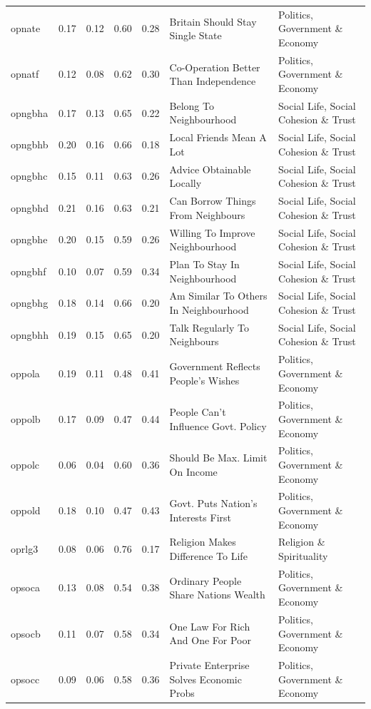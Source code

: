 \documentclass[
  12pt,
]{article}
\begin{document}
\begin{landscape}
\begin{scriptsize}
\begin{longtable}{|p{1.75in}|p{0.3in}|p{0.3in}|p{0.3in}|p{0.3in}|p{2.5in}|p{2.5in}}
opnate & 0.17 & 0.12 & 0.60 & 0.28 & Britain Should Stay Single State & Politics, Government \& Economy \\ 
opnatf & 0.12 & 0.08 & 0.62 & 0.30 & Co-Operation Better Than Independence & Politics, Government \& Economy \\ 
opngbha & 0.17 & 0.13 & 0.65 & 0.22 & Belong To Neighbourhood & Social Life, Social Cohesion \& Trust \\ 
opngbhb & 0.20 & 0.16 & 0.66 & 0.18 & Local Friends Mean A Lot & Social Life, Social Cohesion \& Trust \\ 
opngbhc & 0.15 & 0.11 & 0.63 & 0.26 & Advice Obtainable Locally & Social Life, Social Cohesion \& Trust \\ 
opngbhd & 0.21 & 0.16 & 0.63 & 0.21 & Can Borrow Things From Neighbours & Social Life, Social Cohesion \& Trust \\ 
opngbhe & 0.20 & 0.15 & 0.59 & 0.26 & Willing To Improve Neighbourhood & Social Life, Social Cohesion \& Trust \\ 
opngbhf & 0.10 & 0.07 & 0.59 & 0.34 & Plan To Stay In Neighbourhood & Social Life, Social Cohesion \& Trust \\ 
opngbhg & 0.18 & 0.14 & 0.66 & 0.20 & Am Similar To Others In Neighbourhood & Social Life, Social Cohesion \& Trust \\ 
opngbhh & 0.19 & 0.15 & 0.65 & 0.20 & Talk Regularly To Neighbours & Social Life, Social Cohesion \& Trust \\ 
oppola & 0.19 & 0.11 & 0.48 & 0.41 & Government Reflects People's Wishes & Politics, Government \& Economy \\ 
oppolb & 0.17 & 0.09 & 0.47 & 0.44 & People Can't Influence Govt. Policy & Politics, Government \& Economy \\ 
oppolc & 0.06 & 0.04 & 0.60 & 0.36 & Should Be Max. Limit On Income & Politics, Government \& Economy \\ 
oppold & 0.18 & 0.10 & 0.47 & 0.43 & Govt. Puts Nation's Interests First & Politics, Government \& Economy \\ 
oprlg3 & 0.08 & 0.06 & 0.76 & 0.17 & Religion Makes Difference To Life & Religion \& Spirituality \\ 
opsoca & 0.13 & 0.08 & 0.54 & 0.38 & Ordinary People Share Nations Wealth & Politics, Government \& Economy \\ 
opsocb & 0.11 & 0.07 & 0.58 & 0.34 & One Law For Rich And One For Poor & Politics, Government \& Economy \\ 
opsocc & 0.09 & 0.06 & 0.58 & 0.36 & Private Enterprise Solves Economic Probs & Politics, Government \& Economy \\ 

\end{longtable}
\end{scriptsize}
\end{landscape}
\end{document}
